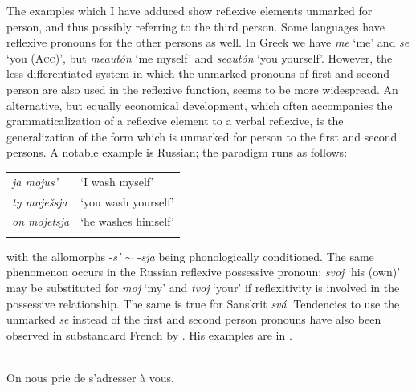 The examples which I have adduced show reflexive elements unmarked for person, and thus possibly referring to the third person. Some languages have reflexive pronouns for the other persons as well. In Greek we have \textit{me} ‘me’ and \textit{se} ‘you (\textsc{Acc})’, but \textit{meautón} ‘me myself’ and \textit{seautón} ‘you yourself’. However, the less differentiated system in which the unmarked pronouns of first and second person are also used in the reflexive function, seems to be more widespread. An alternative, but equally economical development, which often accompanies the grammaticalization of a reflexive element to a verbal reflexive, is the generalization of the form which is unmarked for person to the first and second persons. A notable example is Russian; the paradigm runs as follows:

\begin{table}
\begin{tabular}{ll}
\lsptoprule

\itshape ja mojus' & ‘I wash myself’\\
\itshape ty moješsja & ‘you wash yourself’\\
\itshape on mojetsja & ‘he washes himself’\\
\lspbottomrule
\end{tabular}
\end{table}

\noindent with the allomorphs -\textit{s' ${\sim}$} -\textit{sja} being phonologically conditioned. The same phenomenon occurs in the Russian reflexive possessive pronoun; \textit{svoj} ‘his (own)’ may be substituted for \textit{moj} ‘my’ and \textit{tvoj} ‘your’ if reflexitivity is involved in the possessive relationship. The same is true for Sanskrit \textit{svá}. Tendencies to use the unmarked \textit{se} instead of the first and second person pronouns have also been observed in substandard %
 French by \citet[147]{Frei1929}. His examples are in .

\ea\label{ex:E21}
\langinfo{\LangFren}{}{} \\
 \ea  On nous prie de s'adresser à vous.

